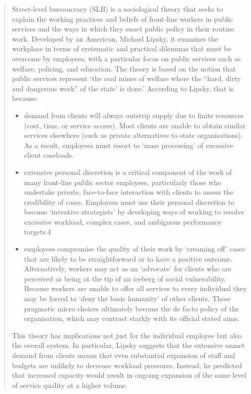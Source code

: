\begin{quote}
Street-level bureaucracy (SLB) is a sociological theory that seeks to explain the working practices and beliefs of front-line workers in public services and the ways in which they enact public policy in their routine work. Developed by an American, Michael Lipsky, it examines the workplace in terms of systematic and practical dilemmas that must be overcome by employees, with a particular focus on public services such as welfare, policing, and education. The theory is based on the notion that public services represent ‘the coal mines of welfare where the “hard, dirty and dangerous work” of the state’ is done.’ According to Lipsky, that is because:

\begin{itemize}
\item demand from clients will always outstrip supply due to finite resources (cost, time, or service access). Most clients are unable to obtain similar services elsewhere (such as private alternatives to state organisations). As a result, employees must resort to ‘mass processing’ of excessive client caseloads.

\item extensive personal discretion is a critical component of the work of many front-line public sector employees, particularly those who undertake private, face-to-face interaction with clients to assess the credibility of cases. Employees must use their personal discretion to become ‘inventive strategists’ by developing ways of working to resolve excessive workload, complex cases, and ambiguous performance targets.4

    \item employees compromise the quality of their work by ‘creaming off’ cases that are likely to be straightforward or to have a positive outcome. Alternatively, workers may act as an ‘advocate’ for clients who are perceived as being at the tip of an iceberg of social vulnerability. Because workers are unable to offer all services to every individual they may be forced to ‘deny the basic humanity’ of other clients. These pragmatic micro choices ultimately become the de facto policy of the organisation, which may contrast starkly with its official stated aims.
\end{itemize}
This theory has implications not just for the individual employee but also the overall system. In particular, Lipsky suggests that the extensive unmet demand from clients means that even substantial expansion of staff and budgets are unlikely to decrease workload pressures. Instead, he predicted that increased capacity would result in ongoing expansion of the same level of service quality at a higher volume.
\end{quote}


